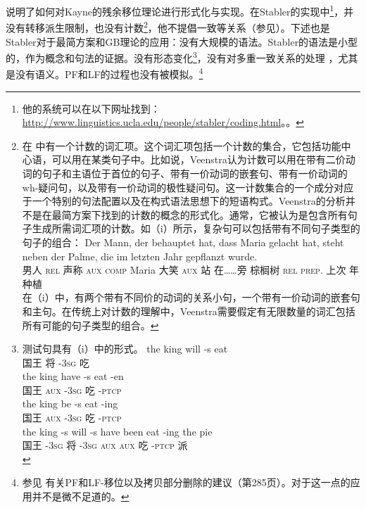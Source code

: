 \citet{Stabler2001a}说明了如何对Kayne的残余移位理论进行形式化与实现。在Stabler的实现中\footnote{%
他的系统可以在以下网址找到：
\url{http://www.linguistics.ucla.edu/people/stabler/coding.html}。。
}，并没有转移派生限制，也没有计数\footnote{%
在 \citet[\S~9]{Veenstra98a}中有一个计数的词汇项。这个词汇项包括一个计数的集合，它包括功能中心语，可以用在某类句子中。比如说，Veenstra认为计数可以用在带有二价动词的句子和主语位于首位的句子、带有一价动词的嵌套句、带有一价动词的wh-疑问句，以及带有一价动词的极性疑问句。这一计数集合的一个成分对应于一个特别的句法配置以及在构式语法\indexcxg 思想下的短语构式。Veenstra的分析并不是在最简方案下找到的计数的概念的形式化。通常，它被认为是包含所有句子生成所需词汇项的计数。如（i）所示，复杂句可以包括带有不同句子类型的句子的组合：
\ea
\gll Der          Mann, der         behauptet hat,         dass          Maria gelacht hat,         steht neben        der          Palme, die im letzten Jahr gepflanzt wurde.\\
      男人  \textsc{rel} 声称      \textsc{aux} \textsc{comp} Maria 大笑     \textsc{aux} 站   在……旁  棕榈树 \textsc{rel} \textsc{prep}. 上次 年 种植 \passivepst{}\\
\z
在（i）中，有两个带有不同价的动词的关系小句，一个带有一价动词的嵌套句和主句。在传统上对计数的理解中，Veenstra需要假定有无限数量的词汇包括所有可能的句子类型的组合。
}，他不提倡一致等关系（参见\citealp[]{Fong2014a}）。下述也是Stabler对于最简方案\indexmg 和GB理论的应用：没有大规模的语法。Stabler的语法是小型的，作为概念和句法的证据。没有形态变化\footnote{%
测试句具有（i）中的形式。
\eal
\ex 
\gll the king will -s eat\\
	 国王 将 -\textsc{3sg} 吃\\
\ex 
\gll the king have -s eat -en\\
	 国王 \textsc{aux} -\textsc{3sg} 吃 -\textsc{ptcp}\\
\ex 
\gll the king be -s eat -ing\\
	 国王 \textsc{aux} -\textsc{3sg} 吃 -\textsc{ptcp}\\
\ex 
\gll the king -s will -s have been eat -ing the pie\\
	 国王 -\textsc{3sg} 将 -\textsc{3sg} \textsc{aux} \textsc{aux} 吃 -\textsc{ptcp}  派\\
\zllast\vspace{-.5\baselineskip}
}，没有对多重一致关系的处理 \citep[\S~27.4.3]{Stabler2010b}，尤其是没有语义。PF和LF的过程也没有被模拟。\footnote{%
	参见 \citet{SE2002a}有关PF和LF-移位以及拷贝部分删除的建议（第285页）。对于这一点的应用并不是微不足道的。
}
